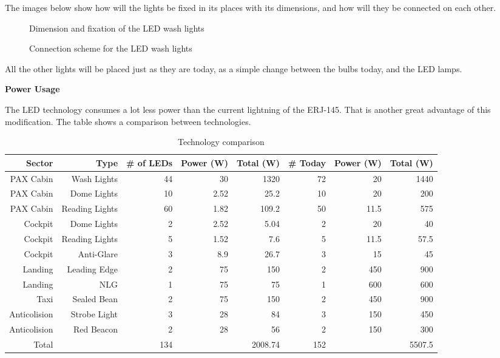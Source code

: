 The images below show how will the lights be fixed in its places with its dimensions, and how will they be connected on each other.


\begin{figure}[H] %
\caption{Dimension and fixation of the LED wash lights}
\label{fig:wash1}
\end{figure}


\begin{figure}[H] %
\caption{Connection scheme for the LED wash lights}
\label{fig:wash2}
\end{figure}

All the other lights will be placed just as they are today, as a simple change between the bulbs today, and the LED lamps.

\textbf{Power Usage}

The LED technology consumes a lot less power than the current lightning of the ERJ-145. That is another great advantage of this modification. The table  shows a comparison between technologies.

\begin{table}[htbp]
  \centering
  \tiny
  \caption{Technology comparison}
    \begin{tabular}{rrrrrrrr}
    \toprule
    Sector & Type  & \# of LEDs & Power (W) & Total (W) & \# Today & Power (W) & Total (W) \\
    \midrule
    PAX Cabin & Wash Lights & 44    & 30    & 1320  & 72    & 20    & 1440 \\
    PAX Cabin & Dome Lights & 10    & 2.52  & 25.2  & 10    & 20    & 200 \\
    PAX Cabin & Reading Lights & 60    & 1.82  & 109.2 & 50    & 11.5  & 575 \\
    Cockpit & Dome Lights & 2     & 2.52  & 5.04  & 2     & 20    & 40 \\
    Cockpit & Reading Lights & 5     & 1.52  & 7.6   & 5     & 11.5  & 57.5 \\
    Cockpit & Anti-Glare & 3     & 8.9   & 26.7  & 3     & 15    & 45 \\
    Landing & Leading Edge & 2     & 75    & 150   & 2     & 450   & 900 \\
    Landing & NLG   & 1     & 75    & 75    & 1     & 600   & 600 \\
    Taxi  & Sealed Bean & 2     & 75    & 150   & 2     & 450   & 900 \\
    Anticolision  & Strobe Light & 3     & 28    & 84    & 3     & 150   & 450 \\
    Anticolision  & Red Beacon & 2     & 28    & 56    & 2     & 150   & 300 \\
    Total &       & 134   &       & 2008.74 & 152   &       & 5507.5 \\
    \bottomrule
    \end{tabular}%
  \label{tab:LEDTechCompare}%
\end{table}%


